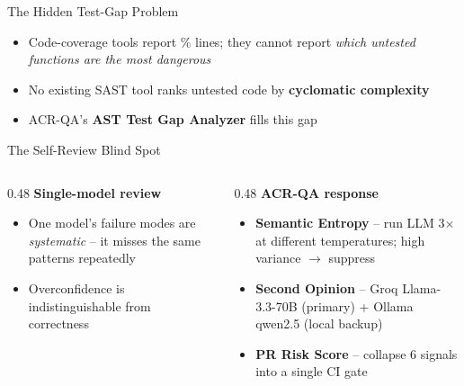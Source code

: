 \documentclass[aspectratio=169,12pt]{beamer}
\newcommand{\highlight}[1]{\textbf{\color{acrBlue}#1}}
\newcommand{\bad}[1]{\textbf{\color{acrRed}#1}}
\begin{document}
\begin{frame}{The Hidden Test-Gap Problem}
  \begin{center}
  \end{center}
  \vspace{8pt}
  \begin{itemize}
    \item Code-coverage tools report \% lines; they cannot report \emph{which untested functions are the most dangerous}
    \item No existing SAST tool ranks untested code by \textbf{cyclomatic complexity}
    \item ACR-QA's \textbf{AST Test Gap Analyzer} fills this gap
  \end{itemize}
\end{frame}

\begin{frame}{The Self-Review Blind Spot}
  \begin{columns}[T]
    \begin{column}{0.48\textwidth}
      \textbf{Single-model review}
      \begin{itemize}
        \item One model's failure modes are \emph{systematic} -- it misses the same patterns repeatedly
        \item Overconfidence is indistinguishable from correctness
      \end{itemize}
    \end{column}
    \begin{column}{0.48\textwidth}
      \textbf{ACR-QA response}
      \begin{itemize}
        \item \highlight{Semantic Entropy} -- run LLM 3\(\times\) at different temperatures; high variance \(\rightarrow\) suppress
        \item \highlight{Second Opinion} -- Groq Llama-3.3-70B (primary) + Ollama qwen2.5 (local backup)
        \item \highlight{PR Risk Score} -- collapse 6 signals into a single CI gate
      \end{itemize}
    \end{column}
  \end{columns}
\end{frame}
\end{document}
